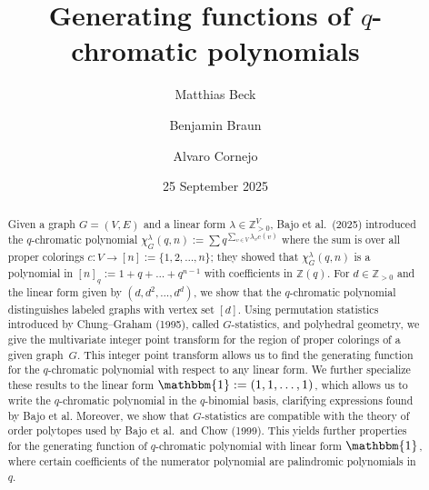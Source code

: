 \documentclass[11pt]{amsart}
\begin{document}
\title{Generating functions of $q$-chromatic polynomials}

\author{Matthias Beck}
\address{Department of Mathematics\\
          San Francisco State University\\
          San Francisco, CA 94132}


 \author{Benjamin Braun}
 \address{Department of Mathematics\\
          University of Kentucky\\
         Lexington, KY 40506}

 
 \author{Alvaro Cornejo}
 \address{Department of Mathematics\\
          University of Kentucky\\
         Lexington, KY 40506}






\date{25 September 2025}

\begin{abstract}
    Given a graph $G=(V,E)$ and a linear form $\lambda \in \mathbb{Z}_{ > 0 }^V$, Bajo et al.~(2025) introduced the
$q$-chromatic polynomial $\chi_G^\lambda(q,n) := \sum q^{\sum_{v \in V} \lambda_v c(v)}$ where the sum is over all
proper colorings $c: V \to [n] := \{ 1, 2, \dots, n \}$; they showed that $\chi_G^\lambda(q,n)$ is a polynomial
in $[n]_q := 1 + q + \dots + q^{ n-1 } $ with coefficients in $\mathbb{Z}(q)$.
    For $d \in \mathbb{Z}_{>0}$ and the linear form given by $(d,d^2,\ldots,d^d)$, we show that the $q$-chromatic polynomial distinguishes labeled graphs with vertex set $[d]$.
    Using permutation statistics introduced by Chung--Graham (1995), called $G$-statistics, and polyhedral geometry, we give the multivariate integer point transform for the region of proper
colorings of a given graph~$G$.
    This integer point transform allows us to find the generating function for the $q$-chromatic polynomial with respect to any linear form.
    We further specialize these results to the linear form $\mathbbm{1} := (1, 1, \dots, 1)$, which allows us to write the $q$-chromatic polynomial in the $q$-binomial basis, clarifying expressions found by Bajo et al.
    Moreover, we show that $G$-statistics are compatible with the theory of order polytopes used by Bajo et
al.\ and Chow (1999).
    This yields further properties for the generating function of $q$-chromatic polynomial with linear form $\mathbbm{1}$, where certain coefficients of the numerator polynomial are palindromic polynomials in $q$.
\end{abstract}
\end{document}
